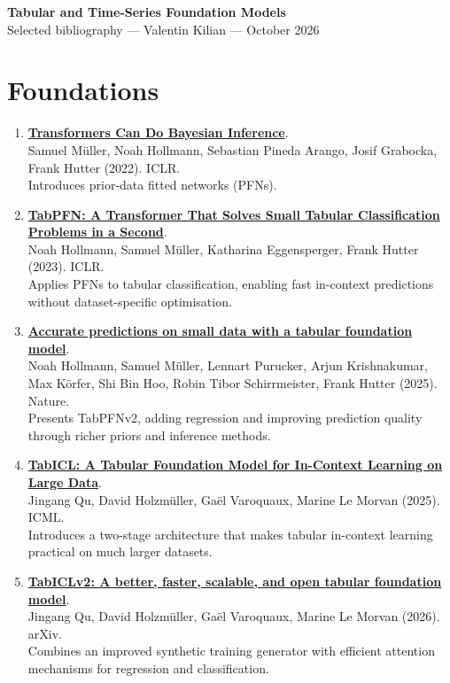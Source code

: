 \documentclass[9pt,a4paper]{extarticle}
\begin{document}
\begin{center}{\Large\bfseries Tabular and Time-Series Foundation Models}\\[2pt]{\small Selected bibliography --- Valentin Kilian --- October 2026}\end{center}


\section{Foundations}
\begin{enumerate}
\item \textbf{\href{https://arxiv.org/abs/2112.10510}{Transformers Can Do Bayesian Inference}}.\\
Samuel M\"uller, Noah Hollmann, Sebastian Pineda Arango, Josif Grabocka, Frank Hutter (2022). ICLR.\\
 Introduces prior-data fitted networks (PFNs).
\item \textbf{\href{https://arxiv.org/abs/2207.01848}{TabPFN: A Transformer That Solves Small Tabular Classification Problems in a Second}}.\\
Noah Hollmann, Samuel M\"uller, Katharina Eggensperger, Frank Hutter (2023). ICLR.\\
 Applies PFNs to tabular classification, enabling fast in-context predictions without dataset-specific optimisation.
\item \textbf{\href{https://doi.org/10.1038/s41586-024-08328-6}{Accurate predictions on small data with a tabular foundation model}}.\\
Noah Hollmann, Samuel M\"uller, Lennart Purucker, Arjun Krishnakumar, Max K\"orfer, Shi Bin Hoo, Robin Tibor Schirrmeister, Frank Hutter (2025). Nature.\\
 Presents TabPFNv2, adding regression and improving prediction quality through richer  priors and inference methods.
\item \textbf{\href{https://arxiv.org/abs/2502.05564}{TabICL: A Tabular Foundation Model for In-Context Learning on Large Data}}.\\
Jingang Qu, David Holzm\"uller, Gaël Varoquaux, Marine Le Morvan (2025). ICML.\\
 Introduces a two-stage architecture that makes tabular in-context learning practical on much larger datasets.
\item \textbf{\href{https://arxiv.org/abs/2602.11139}{TabICLv2: A better, faster, scalable, and open tabular foundation model}}.\\
Jingang Qu, David Holzm\"uller, Gaël Varoquaux, Marine Le Morvan (2026). arXiv.\\
 Combines an improved synthetic training generator with efficient attention mechanisms for regression and classification.
\end{enumerate}
\end{document}
